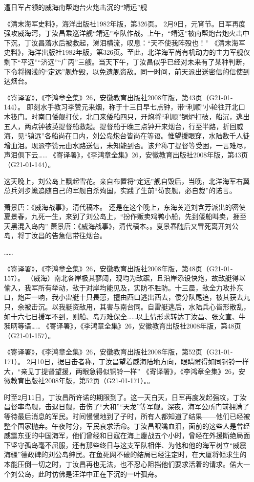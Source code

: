 \documentclass[12pt,UTF8]{ctexbook}
\begin{document}
遭日军占领的威海南帮炮台火炮击沉的“靖远”舰

《清末海军史料》，海洋出版社1982年版，第326页。
2月9日，元宵节。日军再度强攻威海湾，丁汝昌乘巡洋舰“靖远”率队作战。上午，“靖远”被南帮炮台炮火击中下沉，丁汝昌落水后被救起，涕泪横流，叹息：“天不使我阵殁也！” 《清末海军史料》，海洋出版社1982年版，第326页。至此，北洋海军尚有机动力的主力军舰仅剩下“平远”“济远”“广丙”三艘。当天下午，丁汝昌似乎已经对未来有了某种判断，下令将搁浅的“定远”舰炸毁，以免遗舰资敌。同一时间，前天派出送密信的信使到达烟台。

《寄译署》，《李鸿章全集》26，安徽教育出版社2008年版，第43页（G21-01-144）。
即刻水手教习李赞元来烟，称于十三日早七点钟，带“利顺”小轮往开北口木筏门。时南口倭舰打仗，北口来倭船四只，开炮将“利顺”锅炉打破，船沉，逃出五人，两点钟被英提督船救起。提督船于晚三点钟开来烟台，行至半路，折回威海，见“镇远”各船尚在口内，刘公岛炮台皆尚在等语。惟望援眼穿，水陆数千人徒增血泪。现派李赞元由水路送信，未知能到否。该弁称丁提督等受困，一言难尽，声泪俱下云…… 《寄译署》，《李鸿章全集》26，安徽教育出版社2008年版，第43页（G21-01-144）。

这天晚上，刘公岛上飘起雪花。亲自布置将“定远”舰自毁后，当晚，北洋海军右翼总兵刘步蟾追随自己的军舰自杀殉国，实践了生前“苟丧舰，必自裁”的诺言。

萧景唐：《威海战事》，清代稿本。
还是在这个晚上，东海关道刘含芳派出的密使夏景春，九死一生，来到了刘公岛上，“扮作贩卖鸡鸭小船，先到倭船叫卖，捱至天黑混入岛内” 萧景唐：《威海战事》，清代稿本。。夏景春随后又冒死离开刘公岛，将丁汝昌的告急信带往烟台。

……

《寄译署》，《李鸿章全集》26，安徽教育出版社2008年版，第48页（G21-01-157）。
（威海）南北各岸极其寥阔，现均为敌踞，且沿岸添设快炮，故敌艇得以偷入，我军所有举动，敌于对岸均能见及，实防不胜防。十三晨，敌全力攻扑东口，炮声一响，我小雷艇十只畏葸，擅由西口逃出西去，倭分队尾追，被其获去九只，余被击沉。以我艇资敌用，其害与南台同。自雷艇逃后，水陆兵心皆形散乱，如十六七日援军不到，则船、岛万难保全……以上情形求转达丁汝昌、张文宣、牛昶昞等语…… 《寄译署》，《李鸿章全集》26，安徽教育出版社2008年版，第48页（G21-01-157）。

《寄译署》，《李鸿章全集》26，安徽教育出版社2008年版，第52页（G21-01-171）。
2月10日，据目击者称，丁汝昌望着威海陆地方向，眼睛瞪得如同铜铃一样大，“亲见丁提督望援，两眼急得似铜铃一样” 《寄译署》，《李鸿章全集》26，安徽教育出版社2008年版，第52页（G21-01-171）。。

时至2月11日，丁汝昌所许诺的期限到了。这一天白天，日军再度发起强攻，丁汝昌督率岛舰，击退日舰，击伤了“大和”“天龙”等军舰。深夜，海军公所门前拥满了等待最后消息的军民。时间慢慢地到了子时，所有人都知道了结果——他们已经被整个国家抛弃。午夜时分，军民哀求活命。丁汝昌眼噙血泪，面前的这些人是曾经威震东亚的中国海军，他们曾经和日寇在海上鏖战五个小时，曾经在外援断绝局面下坚守孤岛毫不屈服，还有那些终日与这支军队相伴、为他和他的海军树立“威震海疆”德政碑的刘公岛绅民。在鱼死网不破的结局已经注定时，在大厦将倾求生的本能压倒一切之时，丁汝昌再也无法，也不忍心阻挡他们要求活着的请求。偌大一个刘公岛，此时仿佛是汪洋中正在下沉的一叶孤舟。
\end{document}
